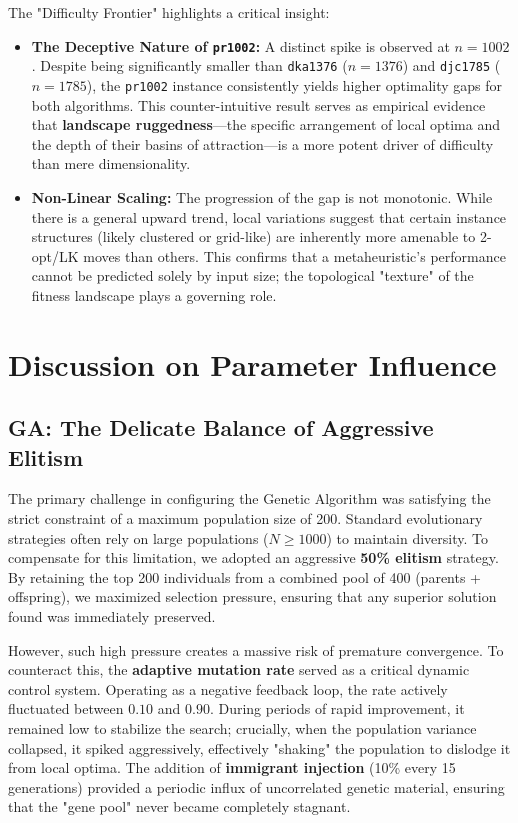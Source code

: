 \documentclass[11pt,a4paper]{article}
\begin{document}
The "Difficulty Frontier" highlights a critical insight:
\begin{itemize}[nosep]
  \item \textbf{The Deceptive Nature of \texttt{pr1002}:} A distinct spike is observed at $n=1002$. Despite being significantly smaller than \texttt{dka1376} ($n=1376$) and \texttt{djc1785} ($n=1785$), the \texttt{pr1002} instance consistently yields higher optimality gaps for both algorithms. This counter-intuitive result serves as empirical evidence that \textbf{landscape ruggedness}—the specific arrangement of local optima and the depth of their basins of attraction—is a more potent driver of difficulty than mere dimensionality.
  \item \textbf{Non-Linear Scaling:} The progression of the gap is not monotonic. While there is a general upward trend, local variations suggest that certain instance structures (likely clustered or grid-like) are inherently more amenable to 2-opt/LK moves than others. This confirms that a metaheuristic's performance cannot be predicted solely by input size; the topological "texture" of the fitness landscape plays a governing role.
\end{itemize}

\section{Discussion on Parameter Influence}
\subsection{GA: The Delicate Balance of Aggressive Elitism}
The primary challenge in configuring the Genetic Algorithm was satisfying the strict constraint of a maximum population size of 200. Standard evolutionary strategies often rely on large populations ($N \ge 1000$) to maintain diversity. To compensate for this limitation, we adopted an aggressive \textbf{50\% elitism} strategy. By retaining the top 200 individuals from a combined pool of 400 (parents + offspring), we maximized selection pressure, ensuring that any superior solution found was immediately preserved.

However, such high pressure creates a massive risk of premature convergence. To counteract this, the \textbf{adaptive mutation rate} served as a critical dynamic control system. Operating as a negative feedback loop, the rate actively fluctuated between $0.10$ and $0.90$. During periods of rapid improvement, it remained low to stabilize the search; crucially, when the population variance collapsed, it spiked aggressively, effectively "shaking" the population to dislodge it from local optima. The addition of \textbf{immigrant injection} (10\% every 15 generations) provided a periodic influx of uncorrelated genetic material, ensuring that the "gene pool" never became completely stagnant.
\end{document}
